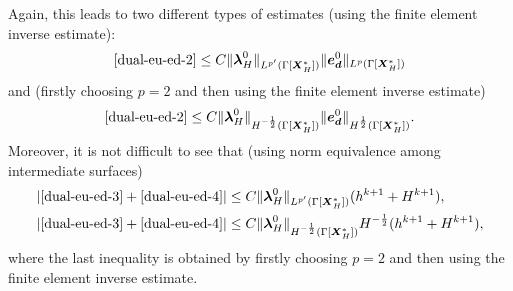 \documentclass[11pt,reqno]{amsart}
\theoremstyle{definition}
\theoremstyle{plain}
\numberwithin{theorem}{section}
\numberwithin{proposition}{section}
\numberwithin{lemma}{section}
\numberwithin{equation}{section}
\newcommand{\bs}[1]{\boldsymbol{#1}}
\newcommand{\dep}{{{\bs{d}}}}
\renewcommand{\(}{\bigl(}
\renewcommand{\)}{\bigr)}
\begin{document}
Again, this leads to two different types of estimates (using the finite element inverse estimate):
$$
\eqref{dual-eu-ed-2} 
\le C \|{\bs\lambda}_H^0\|_{L^{p'}(\Gamma[\bs X_H^*])} \|{\bs e}_\dep^0\|_{L^p(\Gamma[\bs X_H^*])} 
$$
and (firstly choosing $p=2$ and then using the finite element inverse estimate)
$$
\eqref{dual-eu-ed-2} 
\le C \|{\bs\lambda}_H^0\|_{H^{-\frac12}(\Gamma[\bs X_H^*])} \|{\bs e}_\dep^0\|_{H^{\frac12}(\Gamma[\bs X_H^*])} .
$$
Moreover, it is not difficult to see that (using norm equivalence among intermediate surfaces)  
\begin{align*}
|\eqref{dual-eu-ed-3}+\eqref{dual-eu-ed-4}|
&\le C\|{\bs\lambda}_H^0\|_{L^{p'}(\Gamma[\bs X_H^*])} (h^{k+1}+H^{k+1})  ,\\
|\eqref{dual-eu-ed-3}+\eqref{dual-eu-ed-4}|
&\le C\|{\bs\lambda}_H^0\|_{H^{-\frac12}(\Gamma[\bs X_H^*])} H^{-\frac12}(h^{k+1}+H^{k+1}) , 
\end{align*}
where the last inequality is obtained by firstly choosing $p=2$ and then using the finite element inverse estimate. 
\end{document}
